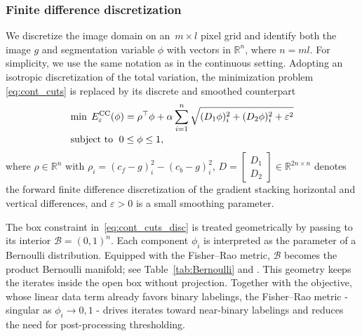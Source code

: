 \documentclass[11pt,reqno]{amsart}
\theoremstyle{plain}
\newcommand\R{\mathbb R}
\newcommand\calB{\mathcal B}
\newcommand{\CC}{{\rm CC}}
\begin{document}
		\subsubsection{Finite difference discretization}
		\label{ssec:CC_discretization}
		We discretize the image domain on an~$m \times l$ pixel grid and identify both the image $g$ and segmentation variable $\phi$ with vectors in $\R^n$, where $n=ml$. For simplicity, we use the same notation as in the continuous setting. Adopting an isotropic discretization of the total variation, the minimization problem 
		\eqref{eq:cont_cuts} is replaced by its discrete and smoothed counterpart
		\begin{equation} \label{eq:cont_cuts_disc}
			\begin{array}{l}
				\displaystyle{\min \; 
					E^{\CC}_\varepsilon(\phi) = \rho^\top \phi + \alpha \sum_{i=1}^n \sqrt{(D_1 \phi)_i^2+(D_2 \phi)_i^2+\varepsilon^2}   }   \\[4mm]
				\text{subject to } \; 0 \leq \phi\leq 1,
			\end{array}
		\end{equation}
		where $\rho \in \R^n$ with $\rho_i = (c_f - g)_i^2 - (c_b - g)_i^2$,  $D  =\begin{bmatrix} D_{1} \\D_{2}\end{bmatrix} \in\R^{2n\times n}$ denotes the forward finite difference discretization of the gradient stacking horizontal and vertical differences, and $\varepsilon > 0$ is a small smoothing parameter.
		
		The box constraint in~\eqref{eq:cont_cuts_disc} is treated geometrically by passing to its interior $\calB=(0,1)^n.$ Each component $\phi_i$ is interpreted as the parameter of a Bernoulli distribution. Equipped with the Fisher--Rao metric, $\calB$ becomes the
		product Bernoulli manifold; see Table~\ref{tab:Bernoulli} and
		\mbox{\cite{Amari:2000,MuePZ23}}. This geometry keeps the iterates
		inside the open box without projection. Together with the objective, whose linear data term already favors binary labelings, the Fisher--Rao metric - singular as $\phi_i\to0,1$ - drives iterates toward near-binary labelings and reduces the need for post-processing thresholding.
		
\end{document}
